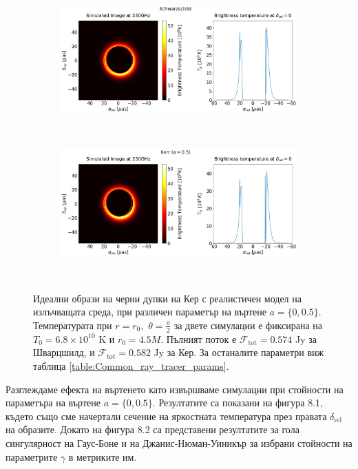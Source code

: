 \begin{figure}[h!]
	\centering
	\begin{subfigure}{12cm}
		\hspace{-1cm}
		\includegraphics[scale = 0.3]{Ray_tracer_plot_230_Sch.png}
	\end{subfigure}\\
	\begin{subfigure}{12cm}
		\hspace{-1cm}
		\includegraphics[scale = 0.3]{Ray_tracer_plot_230_Kerr_0.5.png}
	\end{subfigure}\\
	\label{Kerr_Ray_tracer_230}
	\caption[Идеални образи на черни дупки на Кер с реалистичен модел на излъчващата среда, при различен параметър на въртене $a$]{Идеални образи на черни дупки на Кер с реалистичен модел на излъчващата среда, при различен параметър на въртене $a = \{0, 0.5\}$. Температурата при $r = r_0,\,\,\theta = \frac{\pi}{2}$ за двете симулации е фиксирана на $T_0 = 6.8\times10^{10}$ K и $r_0 = 4.5M$. Пълният поток е $\mathcal{F}_{\text{tot}} = 0.574$ Jy за Шварцшилд, и $\mathcal{F}_{\text{tot}} = 0.582$ Jy за Кер. За останалите параметри виж таблица \ref{table:Common_ray_tracer_params}.} 
\end{figure}

Разглеждаме ефекта на въртенето като извършваме симулации при стойности на параметъра на въртене $a = \{0, 0.5\}$. Резултатите са показани на фигура 8.1, където също сме начертали сечение на яркостната температура през правата $\delta_{\text{rel}}$ на образите. Докато на фигура 8.2 са представени резултатите за гола сингулярност на Гаус-Боне и на Джанис-Нюман-Уиникър за избрани стойности на параметрите $\gamma$ в метриките им.\\

